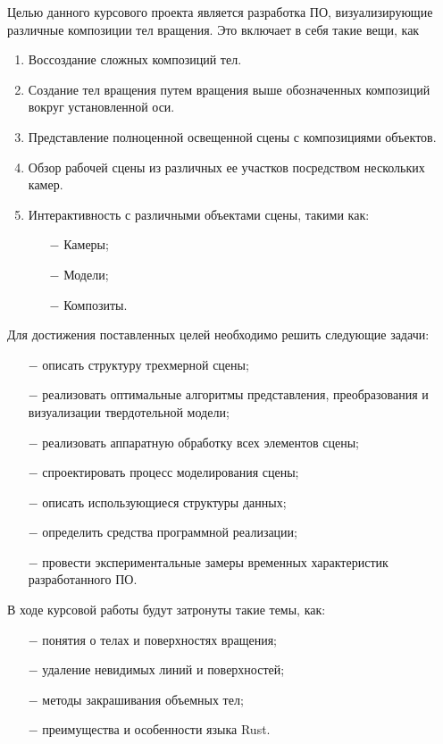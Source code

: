 Целью данного курсового проекта является разработка ПО, визуализирующие различные композиции тел вращения.
Это включает в себя такие вещи, как
\begin{enumerate}%
    \item Воссоздание сложных композиций тел.
    \item Создание тел вращения путем вращения выше обозначенных композиций вокруг установленной оси.
    \item Представление полноценной освещенной сцены с композициями объектов.
    \item Обзор рабочей сцены из различных ее участков посредством нескольких камер.
    \item Интерактивность с различными объектами сцены, такими как:
        \begin{itemize}
        \item[$-$] Камеры;
        \item[$-$] Модели;
        \item[$-$] Композиты.
    \end{itemize}
\end{enumerate}
Для достижения поставленных целей необходимо решить следующие задачи:
\begin{itemize}
    \item[$-$] описать структуру трехмерной сцены;
    \item[$-$] реализовать оптимальные алгоритмы представления, преобразования и визуализации твердотельной модели;
    \item[$-$] реализовать аппаратную обработку всех элементов сцены;
    \item[$-$] спроектировать процесс моделирования сцены;
    \item[$-$] описать использующиеся структуры данных;
    \item[$-$] определить средства программной реализации;
    \item[$-$] провести экспериментальные замеры временных характеристик разработанного ПО.
\end{itemize}
В ходе курсовой работы будут затронуты такие темы, как:
\begin{itemize}
    \item[$-$] понятия о телах и поверхностях вращения;
    \item[$-$] удаление невидимых линий и поверхностей;
    \item[$-$] методы закрашивания объемных тел;
    \item[$-$] преимущества и особенности языка Rust.
\end{itemize}
